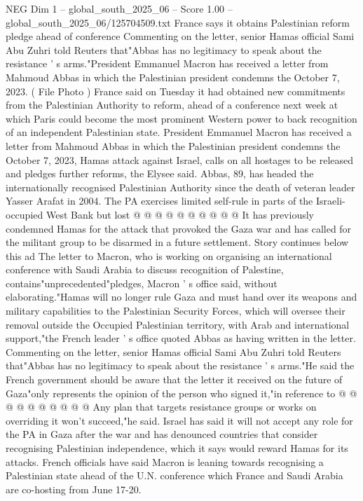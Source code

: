 \begin{textsample}{NEG Dim 1 – global\_south\_2025\_06 – Score 1.00 – global\_south\_2025\_06/125704509.txt}  \label{ex:f1_neg_310}
France says it obtains Palestinian reform pledge ahead of conference Commenting on the letter, senior Hamas official Sami Abu Zuhri told Reuters that"Abbas has no legitimacy to speak about the resistance ' s arms."President Emmanuel Macron has received a letter from Mahmoud Abbas in which the Palestinian president condemns the October 7, 2023. ( File Photo ) France said on Tuesday it had obtained new commitments from the Palestinian Authority to reform, ahead of a conference next week at which Paris could become the most prominent Western power to back recognition of an independent Palestinian state.
President Emmanuel Macron has received a letter from Mahmoud Abbas in which the Palestinian president condemns the October 7, 2023, Hamas attack against Israel, calls on all hostages to be released and pledges further reforms, the Elysee said.
Abbas, 89, has headed the internationally recognised Palestinian Authority since the death of veteran leader Yasser Arafat in 2004.
The PA exercises limited self-rule in parts of the Israeli-occupied West Bank but lost @ @ @ @ @ @ @ @ @ @ It has previously condemned Hamas for the attack that provoked the Gaza war and has called for the militant group to be disarmed in a future settlement.
Story continues below this ad The letter to Macron, who is working on organising an international conference with Saudi Arabia to discuss recognition of Palestine, contains"unprecedented"pledges, Macron ' s office said, without elaborating."Hamas will no longer rule Gaza and must hand over its weapons and military capabilities to the Palestinian Security Forces, which will oversee their removal outside the Occupied Palestinian territory, with Arab and international support,"the French leader ' s office quoted Abbas as having written in the letter.
Commenting on the letter, senior Hamas official Sami Abu Zuhri told Reuters that"Abbas has no legitimacy to speak about the resistance ' s arms."He said the French government should be aware that the letter it received on the future of Gaza"only represents the opinion of the person who signed it,"in reference to @ @ @ @ @ @ @ @ @ @ Any plan that targets resistance groups or works on overriding it won't succeed,"he said.
Israel has said it will not accept any role for the PA in Gaza after the war and has denounced countries that consider recognising Palestinian independence, which it says would reward Hamas for its attacks.
French officials have said Macron is leaning towards recognising a Palestinian state ahead of the U.N. conference which France and Saudi Arabia are co-hosting from June 17-20.

\end{textsample}
